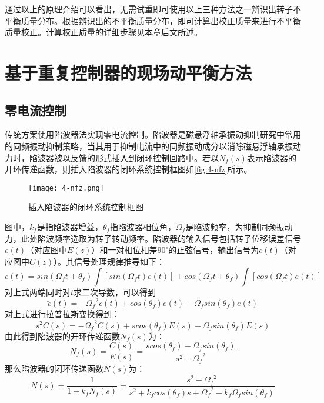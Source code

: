 \documentclass[
  lang=cn,
  degree=master,
  openany,oneside
]{nuaathesis}
\begin{document}
通过以上的原理介绍可以看出，无需试重即可使用以上三种方法之一辨识出转子不平衡质量分布。根据辨识出的不平衡质量分布，即可计算出校正质量来进行不平衡质量校正。计算校正质量的详细步骤见本章后文所述。

\section{基于重复控制器的现场动平衡方法}

\subsection{零电流控制}

传统方案使用陷波器法实现零电流控制。陷波器是磁悬浮轴承振动抑制研究中常用的同频振动抑制策略，当其用于抑制电流中的同频振动成分以消除磁悬浮轴承振动力时，陷波器被以反馈的形式插入到闭环控制回路中。若以$N_f(s)$表示陷波器的开环传递函数，则插入陷波器的闭环系统控制框图如\autoref{fig:4-nfz}所示。

\begin{figure}
	\texttt{[image: 4-nfz.png]}
	\caption{插入陷波器的闭环系统控制框图}
	\label{fig:4-nfz}
\end{figure}

图中，$k_f$是指陷波器增益，$\theta _f$指陷波器相位角，$\Omega _f$是陷波频率，为抑制同频振动力，此处陷波频率选取为转子转动频率。陷波器的输入信号包括转子位移误差信号$e(t)$（对应图中$E(z)$）和一对相位相差$90^{\circ}$的正弦信号，输出信号为$c(t)$（对应图中$C(z)$）。其信号处理规律推导如下：
\begin{equation}
c(t) = sin({\Omega}_f t + \theta _f) \int [sin({\Omega}_f t)e(t)]+cos({\Omega}_f t + \theta _f) \int [cos({\Omega}_f t)e(t)]
\end{equation}
对上式两端同时对$t$求二次导数，可以得到
\begin{equation}
\ddot{c}(t) = -{{\Omega}_f}^2c(t)+cos(\theta _f)\dot{e}(t)-{\Omega}_f sin(\theta _f)e(t)
\end{equation}
对上式进行拉普拉斯变换得到：
\begin{equation}
s^2C(s) = -{{\Omega}_f}^2C(s)+scos(\theta _f)E(s)-{\Omega}_f sin(\theta _f)E(s)
\end{equation}
由此得到陷波器的开环传递函数$N_f(s)$为：
\begin{equation}
N_f(s) = \frac{C(s)}{E(s)} = \frac{scos(\theta _f) - {\Omega}_f sin(\theta _f)}{s^2 + {{\Omega}_f}^2}
\end{equation}
那么陷波器的闭环传递函数$N(s)$为：
\begin{equation}
N(s) = \frac{1}{1+k_fN_f(s)}=\frac{s^2+{{\Omega}_f}^2}{s^2+k_fcos(\theta _f)s + {{\Omega}_f}^2-k_f{\Omega}_f sin(\theta _f)}
\end{equation}
\end{document}
